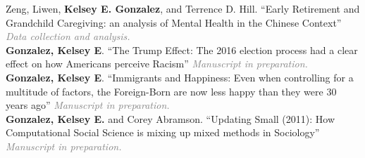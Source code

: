 \years{} Zeng, Liwen, \textbf{Kelsey E. Gonzalez}, and Terrence D. Hill. “Early Retirement and Grandchild Caregiving: an analysis of Mental Health in the Chinese Context” 
\textcolor{gray}{\emph{Data collection and analysis.}} \\

\years{} \textbf{Gonzalez, Kelsey E}. “The Trump Effect: The 2016 election process had a clear effect on how Americans perceive Racism”
\textcolor{gray}{\emph{Manuscript in preparation.}} \\

\years{} \textbf{Gonzalez, Kelsey E}. “Immigrants and Happiness: Even when controlling for a multitude of factors, the Foreign-Born are now less happy than they were 30 years ago”
\textcolor{gray}{\emph{Manuscript in preparation.}} \\


\years{} \textbf{Gonzalez, Kelsey E.} and Corey Abramson. “Updating Small (2011): How Computational Social Science is mixing up mixed methods in Sociology” 
\textcolor{gray}{\emph{Manuscript in preparation.}} \\


